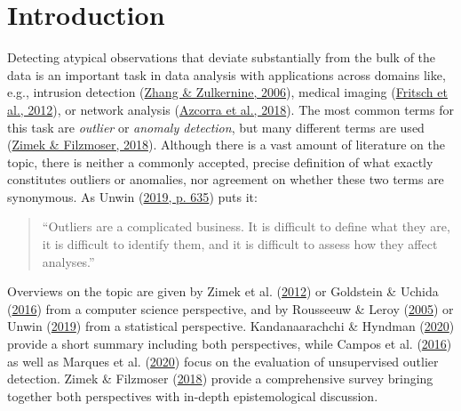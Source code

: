 \documentclass[
  10pt]{article}
\begin{document}
\hypertarget{sec:intro}{%
\section{Introduction}\label{sec:intro}}

Detecting atypical observations that deviate substantially from the bulk of the data is an important task in data analysis with applications across domains like, e.g.,
intrusion detection (\protect\hyperlink{ref-zhang2006anomaly}{Zhang \& Zulkernine, 2006}), medical imaging (\protect\hyperlink{ref-fritsch2012detecting}{Fritsch et al., 2012}), or network analysis (\protect\hyperlink{ref-azcorra2018unsupervised}{Azcorra et al., 2018}).
The most common terms for this task are \emph{outlier} or \emph{anomaly detection}, but
many different terms are used (\protect\hyperlink{ref-zimek2018there}{Zimek \& Filzmoser, 2018}). Although there is a
vast amount of literature on the topic, there is neither a commonly accepted, precise definition of what exactly constitutes outliers or anomalies, nor agreement on whether these two terms are synonymous. As Unwin (\protect\hyperlink{ref-unwin2019multivariate}{2019, p. 635}) puts it:

\begin{quote}
``Outliers are a complicated business. It is difficult to define what they are, it is
difficult to identify them, and it is difficult to assess how they affect analyses.''
\end{quote}

\noindent Overviews on the topic are given by Zimek et al. (\protect\hyperlink{ref-zimek2012survey}{2012}) or Goldstein \& Uchida (\protect\hyperlink{ref-goldstein2016comparative}{2016}) from a computer science perspective, and by Rousseeuw \& Leroy (\protect\hyperlink{ref-rousseeuw2005robust}{2005}) or Unwin (\protect\hyperlink{ref-unwin2019multivariate}{2019}) from a statistical perspective. Kandanaarachchi \& Hyndman (\protect\hyperlink{ref-kandanaarachchi2020dimension}{2020}) provide a short summary including both perspectives, while Campos et al. (\protect\hyperlink{ref-campos2016evaluation}{2016}) as well as Marques et al. (\protect\hyperlink{ref-marques2020internal}{2020}) focus on the evaluation of unsupervised outlier detection. Zimek \& Filzmoser (\protect\hyperlink{ref-zimek2018there}{2018}) provide a comprehensive survey bringing together both perspectives with in-depth epistemological discussion.
\end{document}
